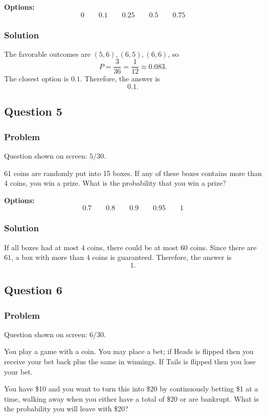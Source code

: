 \documentclass[12pt]{article}
\begin{document}
\noindent\textbf{Options:}
\[
\boxed{0}
\qquad
\boxed{0.1}
\qquad
\boxed{0.25}
\qquad
\boxed{0.5}
\qquad
\boxed{0.75}
\]

\subsubsection{Solution}
The favorable outcomes are \((5,6),(6,5),(6,6)\), so
\[
P=\frac{3}{36}=\frac{1}{12}\approx 0.083.
\]
The closest option is \(0.1\). Therefore, the answer is
\[
\boxed{0.1}.
\]

\subsection{Question 5}
\subsubsection{Problem}
Question shown on screen: \(5/30\).

61 coins are randomly put into 15 boxes. If any of these boxes contains more than 4 coins, you win a prize. What is the probability that you win a prize?

\noindent\textbf{Options:}
\[
\boxed{0.7}
\qquad
\boxed{0.8}
\qquad
\boxed{0.9}
\qquad
\boxed{0.95}
\qquad
\boxed{1}
\]

\subsubsection{Solution}
If all boxes had at most \(4\) coins, there could be at most \(60\) coins. Since there are \(61\), a box with more than \(4\) coins is guaranteed. Therefore, the answer is
\[
\boxed{1}.
\]

\subsection{Question 6}
\subsubsection{Problem}
Question shown on screen: \(6/30\).

You play a game with a coin. You may place a bet; if Heads is flipped then you receive your bet back plus the same in winnings. If Tails is flipped then you lose your bet.

You have \$10 and you want to turn this into \$20 by continuously betting \$1 at a time, walking away when you either have a total of \$20 or are bankrupt. What is the probability you will leave with \$20?
\end{document}
